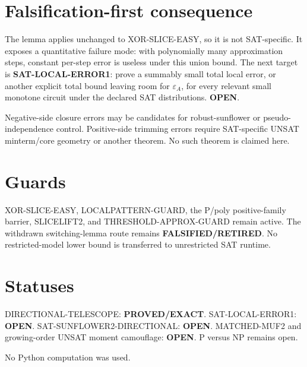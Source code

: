 \documentclass{article}
\begin{document}
\section*{Falsification-first consequence}
The lemma applies unchanged to XOR-SLICE-EASY, so it is not SAT-specific. It exposes a quantitative failure mode: with polynomially many approximation steps, constant per-step error is useless under this union bound. The next target is \textbf{SAT-LOCAL-ERROR1}: prove a summably small total local error, or another explicit total bound leaving room for $\varepsilon_A$, for every relevant small monotone circuit under the declared SAT distributions. \textbf{OPEN}.

Negative-side closure errors may be candidates for robust-sunflower or pseudo-independence control. Positive-side trimming errors require SAT-specific UNSAT minterm/core geometry or another theorem. No such theorem is claimed here.

\section*{Guards}
XOR-SLICE-EASY, LOCALPATTERN-GUARD, the P/poly positive-family barrier, SLICELIFT2, and THRESHOLD-APPROX-GUARD remain active. The withdrawn switching-lemma route remains \textbf{FALSIFIED/RETIRED}. No restricted-model lower bound is transferred to unrestricted SAT runtime.

\section*{Statuses}
DIRECTIONAL-TELESCOPE: \textbf{PROVED/EXACT}. SAT-LOCAL-ERROR1: \textbf{OPEN}. SAT-SUNFLOWER2-DIRECTIONAL: \textbf{OPEN}. MATCHED-MUF2 and growing-order UNSAT moment camouflage: \textbf{OPEN}. P versus NP remains open.

No Python computation was used.

\end{document}
